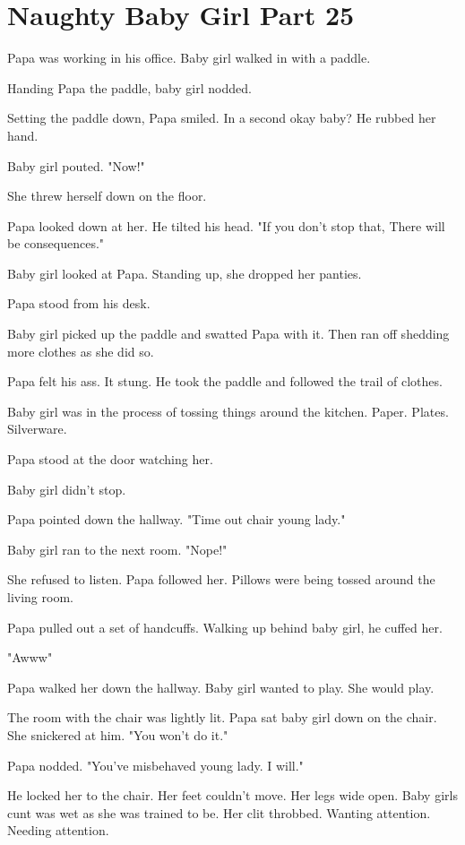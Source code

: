 \section{Naughty Baby Girl Part 25}

     Papa was working in his office. Baby girl walked in with a paddle.

     Handing Papa the paddle, baby girl nodded. 

     Setting the paddle down, Papa smiled. In a second okay baby? He rubbed her hand.

     Baby girl pouted. "Now!"

     She threw herself down on the floor.

     Papa looked down at her. He tilted his head. "If you don't stop that, There will be consequences."

     Baby girl looked at Papa. Standing up, she dropped her panties.

     Papa stood from his desk.

     Baby girl picked up the paddle and swatted Papa with it. Then ran off shedding more clothes as she did so.

     Papa felt his ass. It stung. He took the paddle and followed the trail of clothes.

     Baby girl was in the process of tossing things around the kitchen. Paper. Plates. Silverware.

     Papa stood at the door watching her.

     Baby girl didn't stop.

     Papa pointed down the hallway. "Time out chair young lady."

     Baby girl ran to the next room. "Nope!"

     She refused to listen. Papa followed her. Pillows were being tossed around the living room.

     Papa pulled out a set of handcuffs. Walking up behind baby girl, he cuffed her.

     "Awww"

     Papa walked her down the hallway. Baby girl wanted to play. She would play.

     The room with the chair was lightly lit. Papa sat baby girl down on the chair. She snickered at him. "You won't do it."

     Papa nodded. "You've misbehaved young lady. I will."

     He locked her to the chair. Her feet couldn't move. Her legs wide open. Baby girls cunt was wet as she was trained to be. Her clit throbbed. Wanting attention. Needing attention.


